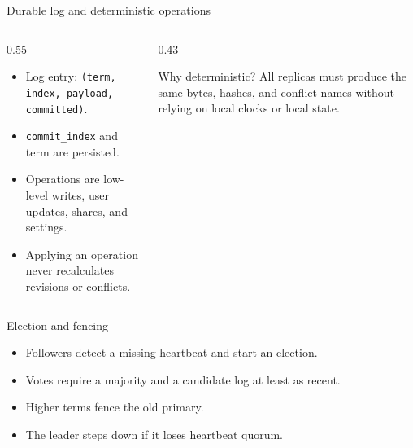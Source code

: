 \documentclass[aspectratio=169]{beamer}
\begin{document}
\begin{frame}{Durable log and deterministic operations}
  \begin{columns}[T]
    \begin{column}{0.55\textwidth}
      \begin{itemize}
        \item Log entry: \texttt{(term, index, payload, committed)}.
        \item \texttt{commit\_index} and term are persisted.
        \item Operations are low-level writes, user updates, shares, and settings.
        \item Applying an operation never recalculates revisions or conflicts.
      \end{itemize}
    \end{column}
    \begin{column}{0.43\textwidth}
      \begin{block}{Why deterministic?}
        All replicas must produce the same bytes, hashes, and conflict names
        without relying on local clocks or local state.
      \end{block}
    \end{column}
  \end{columns}
\end{frame}

\begin{frame}{Election and fencing}
  \centering
  \vspace{0.3cm}
  \begin{itemize}
    \item Followers detect a missing heartbeat and start an election.
    \item Votes require a majority and a candidate log at least as recent.
    \item Higher terms fence the old primary.
    \item The leader steps down if it loses heartbeat quorum.
  \end{itemize}
\end{frame}
\end{document}
